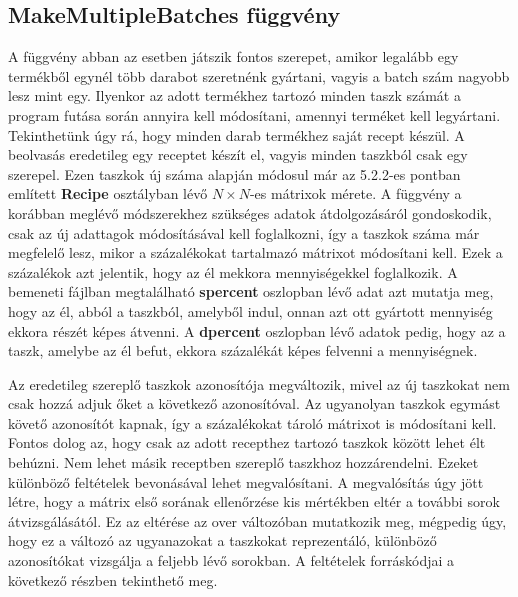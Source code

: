 \subsection{MakeMultipleBatches függvény}
A függvény abban az esetben játszik fontos szerepet, amikor legalább egy termékből egynél több darabot szeretnénk gyártani, vagyis a batch szám nagyobb lesz mint egy. Ilyenkor az adott termékhez tartozó minden taszk számát a program futása során annyira kell módosítani, amennyi terméket kell legyártani. Tekinthetünk úgy rá, hogy minden darab termékhez saját recept készül. A beolvasás eredetileg egy receptet készít el, vagyis minden taszkból csak egy szerepel. Ezen taszkok új száma alapján módosul már az 5.2.2-es pontban említett \textbf{Recipe} osztályban lévő $N\times N$-es mátrixok mérete. A függvény a korábban meglévő módszerekhez szükséges adatok átdolgozásáról gondoskodik, csak az új adattagok módosításával kell foglalkozni, így a taszkok száma már megfelelő lesz, mikor a százalékokat tartalmazó mátrixot módosítani kell. Ezek a százalékok azt jelentik, hogy az él mekkora mennyiségekkel foglalkozik. A bemeneti fájlban megtalálható \textbf{s\textunderscore percent} oszlopban lévő adat azt mutatja meg, hogy az él, abból a taszkból, amelyből indul, onnan azt ott gyártott mennyiség ekkora részét képes átvenni. A \textbf{d\textunderscore percent} oszlopban lévő adatok pedig, hogy az a taszk, amelybe az él befut, ekkora százalékát képes felvenni a mennyiségnek. 

Az eredetileg szereplő taszkok azonosítója megváltozik, mivel az új taszkokat nem csak hozzá adjuk őket a következő azonosítóval. Az ugyanolyan taszkok egymást követő azonosítót kapnak, így a százalékokat tároló mátrixot is módosítani kell. Fontos dolog az, hogy csak az adott recepthez tartozó taszkok között lehet élt behúzni. Nem lehet másik receptben szereplő taszkhoz hozzárendelni. Ezeket különböző feltételek bevonásával lehet megvalósítani. A megvalósítás úgy jött létre, hogy a mátrix  első sorának ellenőrzése kis mértékben eltér a további sorok átvizsgálásától. Ez az eltérése az over változóban mutatkozik meg, mégpedig úgy, hogy ez a változó az ugyanazokat a taszkokat reprezentáló, különböző azonosítókat vizsgálja a feljebb lévő sorokban. A feltételek forráskódjai a következő részben tekinthető meg.

